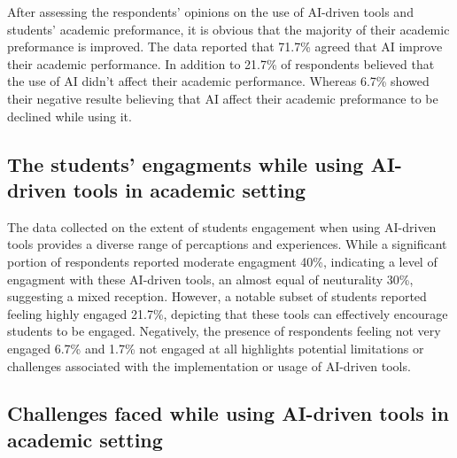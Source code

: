 After assessing the respondents’ opinions on the use of AI-driven tools
and students' academic preformance, it is obvious that the majority
of their academic preformance is improved. The data reported that
71.7\% agreed that AI improve their academic performance. In addition to
21.7\% of respondents believed that the use of AI didn't affect their academic
performance. Whereas 6.7\% showed their negative resulte believing that AI
affect their academic preformance to be declined while using it.

\subsection{The students' engagments while using AI-driven tools in academic setting}


\begin{figure}[h]
	\centering
\end{figure}

The data collected on the extent of students engagement when using AI-driven tools
provides a diverse range of percaptions and experiences. While a significant portion
of respondents reported moderate engagment 40\%, indicating a level of engagment with
these AI-driven tools, an almost equal of neuturality 30\%, suggesting a mixed reception.
However, a notable subset of students reported feeling highly engaged 21.7\%, depicting that
these tools can effectively encourage students to be engaged. Negatively, the presence
of respondents feeling not very engaged 6.7\% and 1.7\% not engaged at all highlights potential
limitations or challenges associated with the implementation or usage of AI-driven tools.


\subsection{Challenges faced while using AI-driven tools in academic setting}

